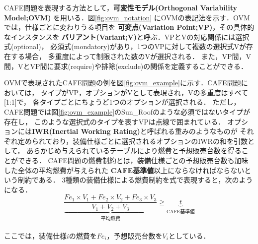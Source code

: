 CAFE問題を表現する方法として，\textbf{可変性モデル(Orthogonal Variability Model;OVM)}
\cite{Pohl05:sple}を用いる．図\ref{fig:ovm_notation}
にOVMの表記法を示す．OVMでは，仕様ごとに変わりうる項目を
\textbf{可変点(Variation Point;VP)}，その具体的なインスタンスを
\textbf{バリアント(Variant;V)}と呼ぶ．VPとVの対応関係には選択式(optional)，
必須式(mondatory)があり，1つのVPに対して複数の選択式Vが存在する場合，
多重度によって制限された数のVが選択される．
また，VP間，V間，VとVP間に要求(require)や排除(exclude)の関係を定義することができる．



OVMで表現されたCAFE問題の例を図\ref{fig:ovm_example}に示す．CAFE問題においては，
タイプがVP，オプションがVとして表現され，Vの多重度はすべて[1:1]で，
各タイプごとにちょうど1つのオプションが選択される．
ただし，CAFE問題では図\ref{fig:ovm_example}のSun\_Roofのような必須ではないタイプが存在し，
このような選択式のタイプを表すVPは点線で囲まれている．
オプションには\textbf{IWR(Inertial Working Rating)}と呼ばれる重みのようなものが
それぞれ定められており，装備仕様ごとに選択されるオプションのIWRの和を引数として，
あらかじめ与えられているテーブルにより燃費と予想販売台数を得ることができる．
CAFE問題の燃費制約とは，装備仕様ごとの予想販売台数も加味した全体の平均燃費が与えられた
\textbf{CAFE基準値}以上にならなければならないという制約である．
3種類の装備仕様による燃費制約を式で表現すると，次のようになる．
\vspace{1em}
 \begin{displaymath}
   \underbrace{
   \frac{Fe_{1} \times V_1 + Fe_{2} \times V_2 + Fe_{3} \times V_3 }{V_1 + V_2 + V_3}
   }_{\mbox{平均燃費}}
   \geq 
   \underbrace{t}_{\mbox{CAFE基準値}}
  \end{displaymath}
\vspace{1em}\\
ここでは，装備仕様$i$の燃費を$Fe_i$，予想販売台数を$V_i$としている．

